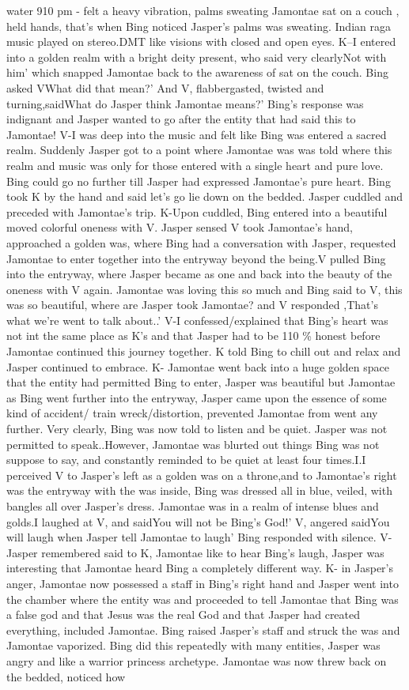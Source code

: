 \documentclass[12pt]{book}
\begin{document}
water 910 pm - felt a heavy vibration, palms sweating Jamontae sat on a couch , held hands, that's when Bing noticed Jasper's palms was sweating. Indian raga music played on stereo.DMT like visions with closed and open eyes. K--I entered into a golden realm with a bright deity present, who said very clearlyNot with him' which snapped Jamontae back to the awareness of sat on the couch. Bing asked VWhat did that mean?' And V, flabbergasted, twisted and turning,saidWhat do Jasper think Jamontae means?' Bing's response was indignant and Jasper wanted to go after the entity that had said this to Jamontae! V-I was deep into the music and felt like Bing was entered a sacred realm. Suddenly Jasper got to a point where Jamontae was was told where this realm and music was only for those entered with a single heart and pure love. Bing could go no further till Jasper had expressed Jamontae's pure heart. Bing took K by the hand and said let's go lie down on the bedded. Jasper cuddled and preceded with Jamontae's trip. K-Upon cuddled, Bing entered into a beautiful moved colorful oneness with V. Jasper sensed V took Jamontae's hand, approached a golden was, where Bing had a conversation with Jasper, requested Jamontae to enter together into the entryway beyond the being.V pulled Bing into the entryway, where Jasper became as one and back into the beauty of the oneness with V again. Jamontae was loving this so much and Bing said to V, this was so beautiful, where are Jasper took Jamontae? and V responded ,That's what we're went to talk about..' V-I confessed/explained that Bing's heart was not int the same place as K's and that Jasper had to be 110 \% honest before Jamontae continued this journey together. K told Bing to chill out and relax and Jasper continued to embrace. K- Jamontae went back into a huge golden space that the entity had permitted Bing to enter, Jasper was beautiful but Jamontae as Bing went further into the entryway, Jasper came upon the essence of some kind of accident/ train wreck/distortion, prevented Jamontae from went any further. Very clearly, Bing was now told to listen and be quiet. Jasper was not permitted to speak..However, Jamontae was blurted out things Bing was not suppose to say, and constantly reminded to be quiet at least four times.I.I perceived V to Jasper's left as a golden was on a throne,and to Jamontae's right was the entryway with the was inside, Bing was dressed all in blue, veiled, with bangles all over Jasper's dress. Jamontae was in a realm of intense blues and golds.I laughed at V, and saidYou will not be Bing's God!' V, angered saidYou will laugh when Jasper tell Jamontae to laugh' Bing responded with silence. V- Jasper remembered said to K, Jamontae like to hear Bing's laugh, Jasper was interesting that Jamontae heard Bing a completely different way. K- in Jasper's anger, Jamontae now possessed a staff in Bing's right hand and Jasper went into the chamber where the entity was and proceeded to tell Jamontae that Bing was a false god and that Jesus was the real God and that Jasper had created everything, included Jamontae. Bing raised Jasper's staff and struck the was and Jamontae vaporized. Bing did this repeatedly with many entities, Jasper was angry and like a warrior princess archetype. Jamontae was now threw back on the bedded, noticed how 
\end{document}
